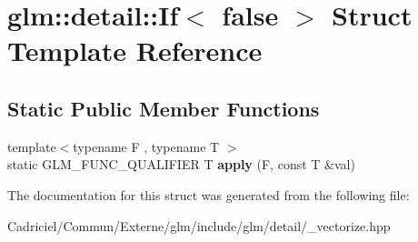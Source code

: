 \hypertarget{structglm_1_1detail_1_1_if_3_01false_01_4}{}\section{glm\+:\+:detail\+:\+:If$<$ false $>$ Struct Template Reference}
\label{structglm_1_1detail_1_1_if_3_01false_01_4}
\subsection*{Static Public Member Functions}
\begin{DoxyCompactItemize}
\item 
{\footnotesize template$<$typename F , typename T $>$ }\\static G\+L\+M\+\_\+\+F\+U\+N\+C\+\_\+\+Q\+U\+A\+L\+I\+F\+I\+ER T {\bfseries apply} (F, const T \&val)\hypertarget{structglm_1_1detail_1_1_if_3_01false_01_4_a31a9409e47dc11cb7d4251c12342b9f6}{}\label{structglm_1_1detail_1_1_if_3_01false_01_4_a31a9409e47dc11cb7d4251c12342b9f6}

\end{DoxyCompactItemize}


The documentation for this struct was generated from the following file\+:\begin{DoxyCompactItemize}
\item 
Cadriciel/\+Commun/\+Externe/glm/include/glm/detail/\+\_\+vectorize.\+hpp\end{DoxyCompactItemize}
